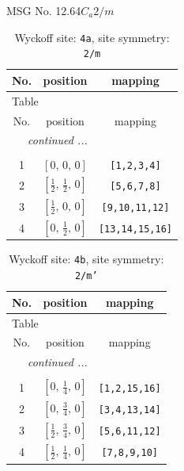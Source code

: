 \documentclass[fleqn,8pt]{jsarticle}
\begin{document}
\setcounter{MaxMatrixCols}{32}

\renewcommand{\tablename}{Table~}
\renewcommand{\figurename}{Figure~}
\begin{center}
\LARGE
MSG No. 12.64\quad$C_{a}2/m$
\end{center}
\renewcommand{\arraystretch}{1.2}
\begin{longtable}{ccc}
\caption{Wyckoff site: {\tt 4a}, site symmetry: {\tt 2/m}}
 \\
 \hline \hline
No. & position & mapping \\ \hline \endfirsthead

\multicolumn{2}{l}{\tablename\ \thetable{}} \\
 \hline \hline
No. & position & mapping \\ \hline \endhead

 \hline \hline
\multicolumn{2}{r}{\footnotesize\it continued ...} \\ \endfoot

 \hline \hline
\multicolumn{2}{r}{} \\ \endlastfoot

1 & $\left[ 0,\, 0,\, 0 \right]$ & {\tt [1,2,3,4]} \\ \hline
2 & $\left[ \frac{1}{2},\, \frac{1}{2},\, 0 \right]$ & {\tt [5,6,7,8]} \\ \hline
3 & $\left[ \frac{1}{2},\, 0,\, 0 \right]$ & {\tt [9,10,11,12]} \\ \hline
4 & $\left[ 0,\, \frac{1}{2},\, 0 \right]$ & {\tt [13,14,15,16]} \\
\end{longtable}
\renewcommand{\arraystretch}{1.2}
\begin{longtable}{ccc}
\caption{Wyckoff site: {\tt 4b}, site symmetry: {\tt 2/m'}}
 \\
 \hline \hline
No. & position & mapping \\ \hline \endfirsthead

\multicolumn{2}{l}{\tablename\ \thetable{}} \\
 \hline \hline
No. & position & mapping \\ \hline \endhead

 \hline \hline
\multicolumn{2}{r}{\footnotesize\it continued ...} \\ \endfoot

 \hline \hline
\multicolumn{2}{r}{} \\ \endlastfoot

1 & $\left[ 0,\, \frac{1}{4},\, 0 \right]$ & {\tt [1,2,15,16]} \\ \hline
2 & $\left[ 0,\, \frac{3}{4},\, 0 \right]$ & {\tt [3,4,13,14]} \\ \hline
3 & $\left[ \frac{1}{2},\, \frac{3}{4},\, 0 \right]$ & {\tt [5,6,11,12]} \\ \hline
4 & $\left[ \frac{1}{2},\, \frac{1}{4},\, 0 \right]$ & {\tt [7,8,9,10]} \\
\end{longtable}
\end{document}

